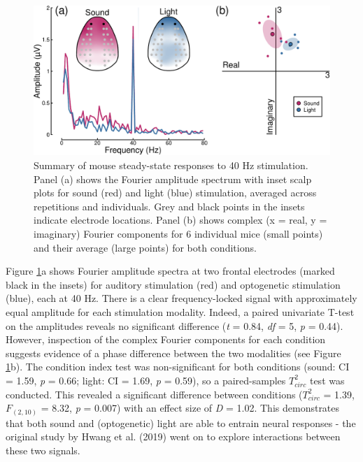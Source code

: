 \documentclass[]{article}
\begin{document}
\begin{figure}

{\centering \includegraphics{manuscript_files/figure-latex/mousedata-1} 

}

\caption{Summary of mouse steady-state responses to 40 Hz stimulation. Panel (a) shows the Fourier amplitude spectrum with inset scalp plots for sound (red) and light (blue) stimulation, averaged across repetitions and individuals. Grey and black points in the insets indicate electrode locations. Panel (b) shows complex (x = real, y = imaginary) Fourier components for 6 individual mice (small points) and their average (large points) for both conditions.}\label{fig:mousedata}
\end{figure}

Figure \ref{fig:mousedata}a shows Fourier amplitude spectra at two frontal electrodes (marked black in the insets) for auditory stimulation (red) and optogenetic stimulation (blue), each at 40 Hz. There is a clear frequency-locked signal with approximately equal amplitude for each stimulation modality. Indeed, a paired univariate T-test on the amplitudes reveals no significant difference (\emph{t} = 0.84, \emph{df} = 5, \emph{p} = 0.44). However, inspection of the complex Fourier components for each condition suggests evidence of a phase difference between the two modalities (see Figure \ref{fig:mousedata}b). The condition index test was non-significant for both conditions (sound: CI = 1.59, \emph{p} = 0.66; light: CI = 1.69, \emph{p} = 0.59), so a paired-samples \(T^2_{circ}\) test was conducted. This revealed a significant difference between conditions (\(T^2_{circ}\) = 1.39, \(F_{(2,10)}\) = 8.32, \emph{p} = 0.007) with an effect size of \emph{D} = 1.02. This demonstrates that both sound and (optogenetic) light are able to entrain neural responses - the original study by Hwang et al. (2019) went on to explore interactions between these two signals.
\end{document}

